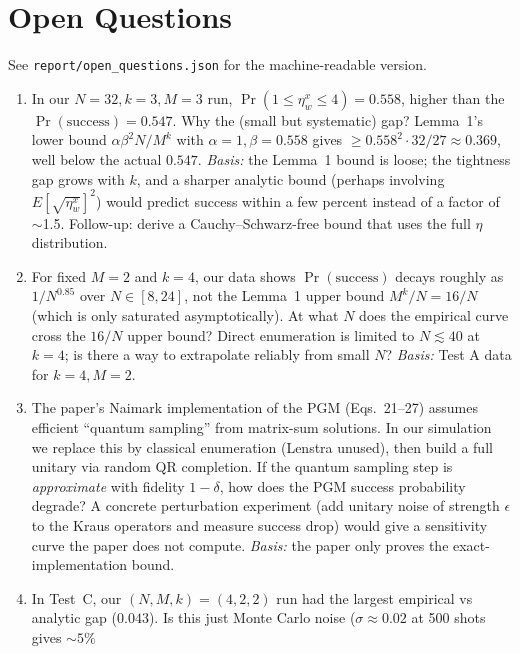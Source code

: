\documentclass[11pt]{article}
\begin{document}
\section{Open Questions}

See \verb|report/open_questions.json| for the machine-readable version.

\begin{enumerate}[label=Q\arabic*.]
  \item In our $N=32, k=3, M=3$ run, $\Pr(1\le\eta_w^x\le 4)=0.558$,
        higher than the $\Pr(\text{success})=0.547$. Why the (small but
        systematic) gap? Lemma~1's lower bound $\alpha\beta^2 N/M^k$
        with $\alpha=1, \beta=0.558$ gives $\ge 0.558^2\cdot 32/27
        \approx 0.369$, well below the actual $0.547$. \emph{Basis:} the
        Lemma~1 bound is loose; the tightness gap grows with $k$, and a
        sharper analytic bound (perhaps involving $E[\sqrt{\eta_w^x}]^2$)
        would predict success within a few percent instead of a factor
        of $\sim$1.5. Follow-up: derive a Cauchy--Schwarz-free bound
        that uses the full $\eta$ distribution.
  \item For fixed $M=2$ and $k=4$, our data shows $\Pr(\text{success})$
        decays roughly as $1/N^{0.85}$ over $N\in[8,24]$, not the
        Lemma~1 upper bound $M^k/N=16/N$ (which is only saturated
        asymptotically). At what $N$ does the empirical curve cross the
        $16/N$ upper bound? Direct enumeration is limited to
        $N\lesssim 40$ at $k=4$; is there a way to extrapolate reliably
        from small $N$? \emph{Basis:} Test A data for $k=4, M=2$.
  \item The paper's Naimark implementation of the PGM (Eqs.~21--27)
        assumes efficient ``quantum sampling'' from matrix-sum
        solutions. In our simulation we replace this by classical
        enumeration (Lenstra unused), then build a full unitary via
        random QR completion. If the quantum sampling step is
        \emph{approximate} with fidelity $1-\delta$, how does the PGM
        success probability degrade? A concrete perturbation experiment
        (add unitary noise of strength $\epsilon$ to the Kraus operators
        and measure success drop) would give a sensitivity curve the
        paper does not compute. \emph{Basis:} the paper only proves the
        exact-implementation bound.
  \item In Test~C, our $(N,M,k)=(4,2,2)$ run had the largest
        empirical vs analytic gap ($0.043$). Is this just Monte Carlo
        noise ($\sigma\approx 0.02$ at 500 shots gives $\sim 5\%$

\end{enumerate}
\end{document}
